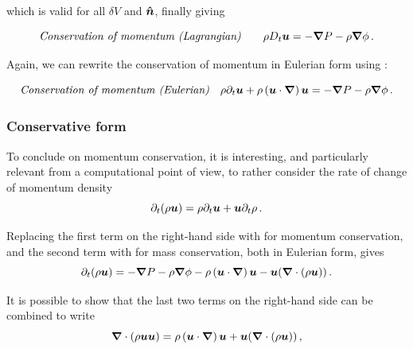 which is valid for all \(\delta V\) and \(\boldsymbol{\hat{n}}\), finally giving
\begin{boxedeq}
    \begin{equation}
        \textit{Conservation of momentum (Lagrangian)} \qquad \rho D_t \boldsymbol{u} = - \boldsymbol{\nabla} P - \rho \boldsymbol{\nabla} \phi \,\mathrm{.} \label{eq:momentum_lag}
    \end{equation}
\end{boxedeq}

Again, we can rewrite the conservation of momentum in Eulerian form using :
\begin{boxedeq}
    \begin{equation}
        \textit{Conservation of momentum (Eulerian)} \quad \rho \partial_t \boldsymbol{u} + \rho \left( \boldsymbol{u} \cdot \boldsymbol{\nabla} \right) \boldsymbol{u} = - \boldsymbol{\nabla} P - \rho \boldsymbol{\nabla} \phi \,\mathrm{.} \label{eq:momentum_eul}
    \end{equation}
\end{boxedeq}

\subsubsection{Conservative form} \label{sec:fluid_cons_form}

To conclude on momentum conservation, it is interesting, and particularly relevant from a computational point of view, to rather consider the rate of change of momentum density
\begin{equation}
    \partial_t (\rho \boldsymbol{u}) = \rho \partial_t \boldsymbol{u} + \boldsymbol{u} \partial_t \rho \,\mathrm{.} \label{eq:conservative_diff}
\end{equation}

Replacing the first term on the right-hand side with  for momentum conservation, and the second term with  for mass conservation, both in Eulerian form, gives
\begin{equation}
    \partial_t (\rho \boldsymbol{u}) = - \boldsymbol{\nabla} P - \rho \boldsymbol{\nabla} \phi - \rho \left( \boldsymbol{u} \cdot \boldsymbol{\nabla} \right) \boldsymbol{u} - \boldsymbol{u} ( \boldsymbol{\nabla} \cdot (\rho \boldsymbol{u})) \,\mathrm{.}
\end{equation}

It is possible to show that the last two terms on the right-hand side can be combined to write
\begin{equation}
    \boldsymbol{\nabla} \cdot (\rho \boldsymbol{u} \boldsymbol{u} )= \rho \left( \boldsymbol{u} \cdot \boldsymbol{\nabla} \right) \boldsymbol{u} + \boldsymbol{u} ( \boldsymbol{\nabla} \cdot (\rho \boldsymbol{u})) \,\mathrm{,}
\end{equation}


